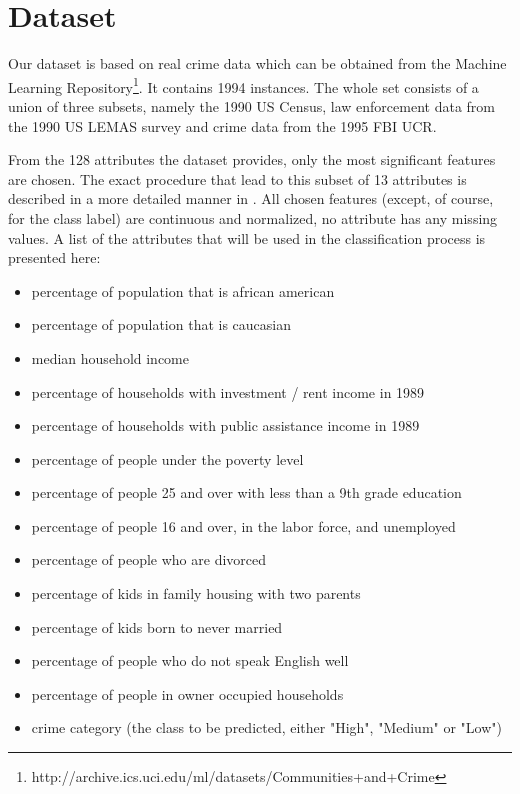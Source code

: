 \section{Dataset}

Our dataset is based on real crime data which can be obtained from the Machine Learning
Repository\footnote{http://archive.ics.uci.edu/ml/datasets/Communities+and+Crime}. It contains 1994 instances. The whole set consists of a union of
three subsets, namely the 1990 US Census, law enforcement data from
the 1990 US LEMAS survey and crime data from the 1995 FBI UCR.

From the 128 attributes the dataset provides, only the most
significant features are chosen.
The exact procedure that lead to this subset of 13 attributes
is described in a more detailed manner in .
All chosen features (except, of course, for the class label)
are continuous and normalized, no attribute has any missing
values.
A list of the attributes that will be used in the classification process is
presented here:
\begin{itemize}
  \setlength{\itemsep}{-2pt}
  \item percentage of population that is african american
  \item percentage of population that is caucasian
  \item median household income
  \item percentage of households with investment / rent income in 1989
  \item percentage of households with public assistance income in 1989
  \item percentage of people under the poverty level
  \item percentage of people 25 and over with less than a 9th grade education
  \item percentage of people 16 and over, in the labor force, and unemployed
  \item percentage of people who are divorced
  \item percentage of kids in family housing with two parents
  \item percentage of kids born to never married
  \item percentage of people who do not speak English well
  \item percentage of people in owner occupied households
  \item crime category (the class to be predicted, either "High", "Medium" or "Low")
\end{itemize}

